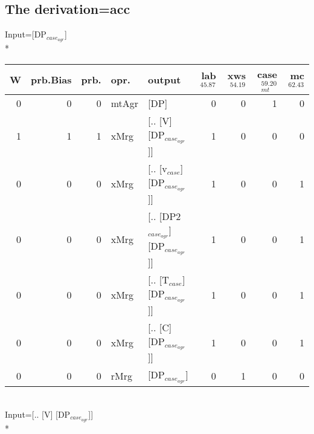 \subsection{The derivation=acc}
\begingroup\scriptsize Input=[DP$_{case_{agr}}$]\\*
\begin{tabularx}{\linewidth}{rrrlXrrrr}
\hline
   W &   prb.Bias &   prb. & opr.    & output                            &   lab$^{45.87}$ &   xws$^{54.19}$ &   case$_{mt}^{59.20}$ &   mc$^{62.43}$ \\
\hline
   0 &       0 &   0 & mtAgr & [DP]                              &             0 &             0 &                 1 &            0 \\
   1 &       1 &   1 & xMrg  & [.. [V] [DP$_{case_{agr}}$]]            &             1 &             0 &                 0 &            0 \\
   0 &       0 &   0 & xMrg  & [.. [v$_{case}$] [DP$_{case_{agr}}$]]       &             1 &             0 &                 0 &            1 \\
   0 &       0 &   0 & xMrg  & [.. [DP2$_{case_{agr}}$] [DP$_{case_{agr}}$]] &             1 &             0 &                 0 &            1 \\
   0 &       0 &   0 & xMrg  & [.. [T$_{case}$] [DP$_{case_{agr}}$]]       &             1 &             0 &                 0 &            1 \\
   0 &       0 &   0 & xMrg  & [.. [C] [DP$_{case_{agr}}$]]            &             1 &             0 &                 0 &            1 \\
   0 &       0 &   0 & rMrg  & [DP$_{case_{agr}}$]                     &             0 &             1 &                 0 &            0 \\
\hline
\end{tabularx}\endgroup\\
\begingroup\scriptsize Input=[.. [V] [DP$_{case_{agr}}$]]\\*
